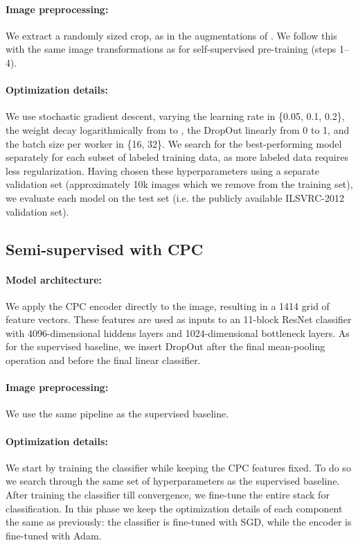 \documentclass{article}
\begin{document}
\paragraph{Image preprocessing: } We extract a randomly sized crop, as in the augmentations of \citet{szegedy2014going}. We follow this with the same image transformations as for self-supervised pre-training (steps 1--4).
    
\paragraph{Optimization details:} We use stochastic gradient descent, varying the learning rate in \{0.05, 0.1, 0.2\}, the weight decay  logarithmically from  to , the DropOut linearly from 0 to 1, and the batch size per worker in \{16, 32\}. We search for the best-performing model separately for each subset of labeled training data, as more labeled data requires less regularization. Having chosen these hyperparameters using a separate validation set (approximately 10k images which we remove from the training set), we evaluate each model on the test set (i.e. the publicly available ILSVRC-2012 validation set). 

\subsection{Semi-supervised with CPC}

\paragraph{Model architecture:} We apply the CPC encoder directly to the image, resulting in a 1414 grid of feature vectors. These features are used as inputs to an 11-block ResNet classifier with 4096-dimensional hiddens layers and 1024-dimensional bottleneck layers. As for the supervised baseline, we insert DropOut after the final mean-pooling operation and before the final linear classifier. 

\paragraph{Image preprocessing:} We use the same pipeline as the supervised baseline. 

\paragraph{Optimization details:} We start by training the classifier while keeping the CPC features fixed. To do so we search through the same set of hyperparameters as the supervised baseline. After training the classifier till convergence, we fine-tune the entire stack for classification. In this phase we keep the optimization details of each component the same as previously: the classifier is fine-tuned with SGD, while the encoder is fine-tuned with Adam.
\end{document}
